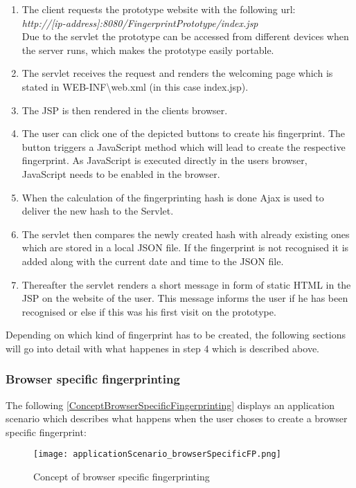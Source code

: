 \begin{enumerate}
	\item The client requests the prototype website with the following url:\\ \textit{http://[ip-address]:8080/FingerprintPrototype/index.jsp}\\
	Due to the servlet the prototype can be accessed from different devices when the server runs, which makes the prototype easily portable.
	\item The servlet receives the request and renders the welcoming page which is stated in WEB-INF\textbackslash web.xml (in this case index.jsp).
	\item The JSP is then rendered in the clients browser.
	\item The user can click one of the depicted buttons to create his fingerprint. The button triggers a JavaScript method which will lead to create the respective fingerprint. As JavaScript is executed directly in the users browser, JavaScript needs to be enabled in the browser.
	\item When the calculation of the fingerprinting hash is done Ajax is used to deliver the new hash to the Servlet.
	\item The servlet then compares the newly created hash with already existing ones which are stored in a local JSON file. If the fingerprint is not recognised it is added along with the current date and time to the JSON file.
	\item Thereafter the servlet renders a short message in form of static HTML in the JSP on the website of the user. This message informs the user if he has been recognised or else if this was his first visit on the prototype.\\
\end{enumerate}
Depending on which kind of fingerprint has to be created, the following sections will go into detail with what happenes in step 4 which is described above.


\subsubsection{Browser specific fingerprinting}\label{sec:appBrowserSpecific}

The following \autoref{ConceptBrowserSpecificFingerprinting} displays an application scenario which describes what happens when the user choses to create a browser specific fingerprint:

\begin{figure}[H]
	\centering
	\texttt{[image: applicationScenario\_browserSpecificFP.png]}
	\caption{Concept of browser specific fingerprinting\\}
	\label{ConceptBrowserSpecificFingerprinting}
\end{figure}

